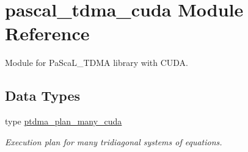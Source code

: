 \hypertarget{namespacepascal__tdma__cuda}{}\section{pascal\+\_\+tdma\+\_\+cuda Module Reference}
\label{namespacepascal__tdma__cuda}


Module for Pa\+Sca\+L\+\_\+\+T\+D\+MA library with C\+U\+DA.  


\subsection*{Data Types}
\begin{DoxyCompactItemize}
\item 
type \hyperlink{structpascal__tdma__cuda_1_1ptdma__plan__many__cuda}{ptdma\+\_\+plan\+\_\+many\+\_\+cuda}
\begin{DoxyCompactList}\small\item\em Execution plan for many tridiagonal systems of equations. \end{DoxyCompactList}\end{DoxyCompactItemize}
